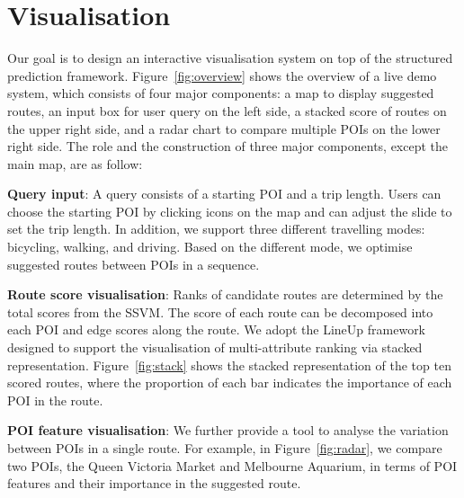 \section{Visualisation}
Our goal is to design an interactive visualisation system on top of the structured prediction framework.
Figure~\ref{fig:overview} shows the overview of a live demo system, which consists of four major components: a map to display suggested routes, an input box for user query on the left side, a stacked score of routes on the upper right side, and a radar chart to compare multiple POIs on the lower right side. 
The role and the construction of three major components, except the main map, are as follow:

\textbf{Query input}: A query consists of a starting POI and a trip length. 
Users can choose the starting POI by clicking icons on the map and can adjust the slide to set the trip length. 
In addition, we support three different travelling modes: bicycling, walking, and driving.
Based on the different mode, we optimise suggested routes between POIs in a sequence.

\textbf{Route score visualisation}: Ranks of candidate routes are determined by the total scores from the SSVM. 
The score of each route can be decomposed into each POI and edge scores along the route. 
We adopt the LineUp framework~\cite{gratzl2013lineup} designed to support the visualisation of multi-attribute ranking via stacked representation. 
Figure~\ref{fig:stack} shows the stacked representation of the top ten scored routes, where the proportion of each bar indicates the importance of each POI in the route.

\textbf{POI feature visualisation}: We further provide a tool to analyse the variation between POIs in a single route. 
For example, in Figure~\ref{fig:radar}, we compare two POIs, the Queen Victoria Market and Melbourne Aquarium, in terms of POI features and their importance in the suggested route. 

